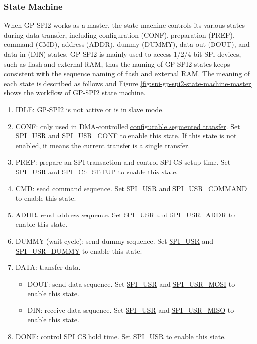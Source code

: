 \documentclass[main\_\_EN.tex]{subfiles}
\begin{document}
\subsubsection{State Machine}
\label{sec:spi-state-machine}

When GP-SPI2 works as a master, the state machine controls its various states during data transfer, including configuration (CONF), preparation (PREP), command (CMD), address (ADDR), dummy (DUMMY), data out (DOUT), and data in (DIN) states. GP-SPI2 is mainly used to access 1/2/4-bit SPI devices, such as flash and external RAM, thus the naming of GP-SPI2 states keeps consistent with the sequence naming of flash and external RAM. The meaning of each state is described as follows and Figure \ref{fig:spi-gp-spi2-state-machine-master} shows the workflow of GP-SPI2 state machine.

\begin{enumerate}
    \item IDLE: GP-SPI2 is not active or is in slave mode.
    \item CONF: only used in DMA-controlled \hyperref[sec:spi-dma-ctrl-config-seg-transfer]{configurable segmented transfer}. Set \hyperref[fielddesc:SPIUSR]{SPI\_USR} and \hyperref[fielddesc:SPIUSRCONF]{SPI\_USR\_CONF} to enable this state. If this state is not enabled, it means the current transfer is a single transfer.
    \item PREP: prepare an SPI transaction and control SPI CS setup time. Set \hyperref[fielddesc:SPIUSR]{SPI\_USR} and \hyperref[fielddesc:SPICSSETUP]{SPI\_CS\_SETUP} to enable this state.
    \item\label{other:spi-item-cmd} CMD: send command sequence. Set \hyperref[fielddesc:SPIUSR]{SPI\_USR} and \hyperref[fielddesc:SPIUSRCOMMAND]{SPI\_USR\_COMMAND} to enable this state.
    \item\label{other:spi-item-addr} ADDR: send address sequence. Set \hyperref[fielddesc:SPIUSR]{SPI\_USR} and \hyperref[fielddesc:SPIUSRADDR]{SPI\_USR\_ADDR} to enable this state.
    \item DUMMY (wait cycle): send dummy sequence. Set \hyperref[fielddesc:SPIUSR]{SPI\_USR} and \hyperref[fielddesc:SPIUSRDUMMY]{SPI\_USR\_DUMMY} to enable this state.
    \item\label{other:spi-item-data} DATA: transfer data.
    \begin{itemize}
    \item DOUT: send data sequence. Set \hyperref[fielddesc:SPIUSR]{SPI\_USR} and \hyperref[fielddesc:SPIUSRMOSI]{SPI\_USR\_MOSI} to enable this state.
    \item DIN: receive data sequence. Set \hyperref[fielddesc:SPIUSR]{SPI\_USR} and \hyperref[fielddesc:SPIUSRMISO]{SPI\_USR\_MISO} to enable this state.
    \end{itemize}
    \item DONE: control SPI CS hold time. Set \hyperref[fielddesc:SPIUSR]{SPI\_USR} to enable this state.
\end{enumerate}
\end{document}
